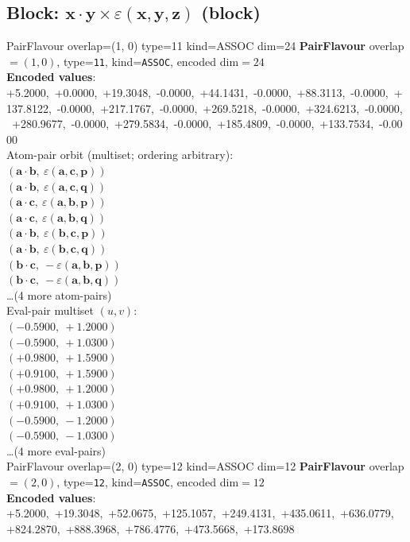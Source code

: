 \documentclass[a4paper,11pt]{article}
\newcommand{\pdcegfomjfhook}[2]{\mathbf{#1} \cdot \mathbf{#2}}
\newcommand{\kblbmcpggoncpf}[3]{\varepsilon(\mathbf{#1},\mathbf{#2},\mathbf{#3})}
\begin{document}
\subsection{Block: $\pdcegfomjfhook{x}{y} \times \kblbmcpggoncpf{x}{y}{z}$  (block)}
    PairFlavour  overlap=(1, 0)  type=11  kind=ASSOC  dim=24
\textbf{PairFlavour} overlap$=(1, 0)$, type=\texttt{11}, kind=\texttt{ASSOC}, encoded dim$=24$\\
\textbf{      Encoded values}: +5.2000,\ +0.0000,\ +19.3048,\ -0.0000,\ +44.1431,\ -0.0000,\ +88.3113,\ -0.0000,\ +137.8122,\ -0.0000,\ +217.1767,\ -0.0000,\ +269.5218,\ -0.0000,\ +324.6213,\ -0.0000,\ +280.9677,\ -0.0000,\ +279.5834,\ -0.0000,\ +185.4809,\ -0.0000,\ +133.7534,\ -0.0000\\
\quad Atom-pair orbit (multiset; ordering arbitrary):\\
$(\pdcegfomjfhook{a}{b},\ \kblbmcpggoncpf{a}{c}{p})$\\
$(\pdcegfomjfhook{a}{b},\ \kblbmcpggoncpf{a}{c}{q})$\\
$(\pdcegfomjfhook{a}{c},\ \kblbmcpggoncpf{a}{b}{p})$\\
$(\pdcegfomjfhook{a}{c},\ \kblbmcpggoncpf{a}{b}{q})$\\
$(\pdcegfomjfhook{a}{b},\ \kblbmcpggoncpf{b}{c}{p})$\\
$(\pdcegfomjfhook{a}{b},\ \kblbmcpggoncpf{b}{c}{q})$\\
$(\pdcegfomjfhook{b}{c},\ -\kblbmcpggoncpf{a}{b}{p})$\\
$(\pdcegfomjfhook{b}{c},\ -\kblbmcpggoncpf{a}{b}{q})$\\
\quad \ldots (4 more atom-pairs)\\
\quad Eval-pair multiset $(u, v)$:\\
$(-0.5900,\ +1.2000)$\\
$(-0.5900,\ +1.0300)$\\
$(+0.9800,\ +1.5900)$\\
$(+0.9100,\ +1.5900)$\\
$(+0.9800,\ +1.2000)$\\
$(+0.9100,\ +1.0300)$\\
$(-0.5900,\ -1.2000)$\\
$(-0.5900,\ -1.0300)$\\
\quad \ldots (4 more eval-pairs)\\
    PairFlavour  overlap=(2, 0)  type=12  kind=ASSOC  dim=12
\textbf{PairFlavour} overlap$=(2, 0)$, type=\texttt{12}, kind=\texttt{ASSOC}, encoded dim$=12$\\
\textbf{      Encoded values}: +5.2000,\ +19.3048,\ +52.0675,\ +125.1057,\ +249.4131,\ +435.0611,\ +636.0779,\ +824.2870,\ +888.3968,\ +786.4776,\ +473.5668,\ +173.8698\\
\end{document}
